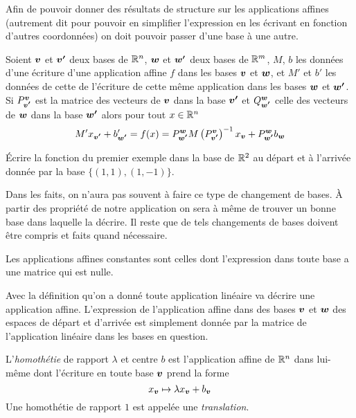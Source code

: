 \documentclass[11pt, a4paper]{article}
\begin{document}
Afin de pouvoir donner des résultats de structure sur les applications
affines (autrement dit pour pouvoir en simplifier l'expression en les
écrivant en fonction d'autres coordonnées) on doit pouvoir passer
d'une base à une autre.
\begin{prop}
  Soient $\boldsymbol{v}$ et $\boldsymbol{v'}$ deux bases de $\mathbb{R}^n$, $\boldsymbol{w}$ et
  $\boldsymbol{w'}$ deux bases de $\mathbb{R}^m$, $M$, $b$ les données d'une écriture
  d'une application affine $f$ dans les bases $\boldsymbol{v}$ et $\boldsymbol{w}$, et
  $M'$ et $b'$ les données de cette de l'écriture de cette même
  application dans les bases $\boldsymbol{w}$ et $\boldsymbol{w'}$. Si
  $P_{\boldsymbol{v'}}^{\boldsymbol{v}}$ est la matrice des vecteurs de $\boldsymbol{v}$ dans
  la base $\boldsymbol{v'}$ et $Q_{\boldsymbol{w'}}^{\boldsymbol{w}}$ celle des vecteurs de
  $\boldsymbol{w}$ dans la base $\boldsymbol{w'}$ alors pour tout $x \in \mathbb{R}^n$
  \[
  M'x_{\boldsymbol{v'}} + b'_{\boldsymbol{w'}} = f(x) =
  P_{\boldsymbol{w'}}^{\boldsymbol{w}}M\left(P_{\boldsymbol{v'}}^{\boldsymbol{v}}\right)^{-1}x_{\boldsymbol{v}}
  + P_{\boldsymbol{w'}}^{\boldsymbol{w}}b_{\boldsymbol{w}}
  \]
\end{prop}
\begin{question}
  Écrire la fonction du premier exemple dans la base de $\mathbb{R}^2$ au
  départ et à l'arrivée donnée par la base $\{(1, 1), (1, -1)\}$.
\end{question}
\begin{rem}
  Dans les faits, on n'aura pas souvent à faire ce type de changement
  de bases. À partir des propriété de notre application on sera à
  même de trouver un bonne base dans laquelle la décrire. Il reste que
  de tels changements de bases doivent être compris et faits quand
  nécessaire.
\end{rem}
\begin{exmp}
  Les applications affines constantes sont celles dont l'expression
  dans toute base a une matrice qui est nulle.
\end{exmp}
\begin{exmp}
  Avec la définition qu'on a donné toute application linéaire va
  décrire une application affine. L'expression de l'application affine
  dans des bases $\boldsymbol{v}$ et $\boldsymbol{w}$ des espaces de départ et
  d'arrivée est simplement donnée par la matrice de l'application
  linéaire dans les bases en question.
\end{exmp}
\begin{exmp}
  L'\emph{homothétie} de rapport $\lambda$ et centre $b$ est
  l'application affine de $\mathbb{R}^n$ dans lui-même dont l'écriture en
  toute base $\boldsymbol{v}$ prend la forme
  \[
  x_{\boldsymbol{v}} \mapsto \lambda x_{\boldsymbol{v}} + b_{\boldsymbol{v}}
  \]
  Une homothétie de rapport $1$ est appelée une \emph{translation}.
\end{exmp}
\end{document}
